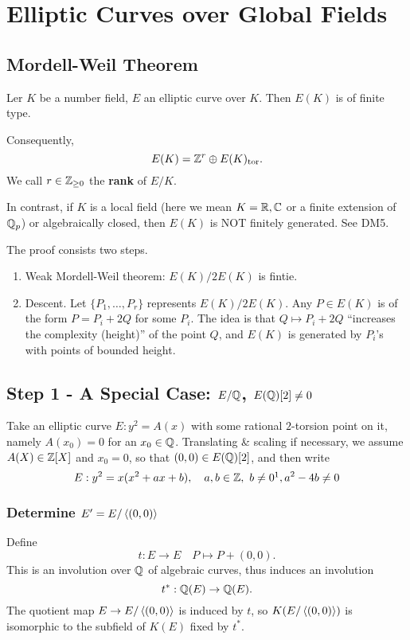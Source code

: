 \section{Elliptic Curves over Global Fields}

\subsection{Mordell-Weil Theorem}
\begin{theorem}
    Ler $K$ be a number field, $E$ an elliptic curve over $K$.
    Then $E(K)$ is of finite type.
\end{theorem}
Consequently, \[E(K) = \mathbb{Z}^r\oplus E(K)_{\mathrm{tor}}.\]
We call $r\in\mathbb{Z}_{\ge 0}$ the \textbf{rank} of $E/K$.
\begin{remark}
    In contrast, if $K$ is a local field (here we mean $K = \mathbb{R}, \mathbb{C}$ or a finite extension of $\mathbb{Q}_p$) or algebraically closed,
    then $E(K)$ is NOT finitely generated. See DM5.
\end{remark}
The proof consists two steps.
\begin{enumerate}
    \item Weak Mordell-Weil theorem: $E(K)/2E(K)$ is fintie.
    \item Descent. Let $\{P_1, \dots, P_r\}$ represents $E(K)/2E(K)$.
    Any $P\in E(K)$ is of the form
    $P = P_i +2Q$ for some $P_i$.
    The idea is that $Q\mapsto P_i + 2Q$ ``increases the complexity (height)'' of the point $Q$, and $E(K)$ is generated by $P_i$'s with points of bounded height.
\end{enumerate}

\subsection{Step 1 - A Special Case: \texorpdfstring{$E/\mathbb{Q}$, $E(\mathbb{Q})[2]\ne 0$}{E/Q, E(Q)[2] ne 0}}
Take an elliptic curve $E : y^2 = A(x)$ with some rational $2$-torsion point on it,
namely $A(x_0) = 0$ for an $x_0\in\mathbb{Q}$.
Translating \& scaling if necessary, we assume $A(X)\in\mathbb{Z}[X]$ and $x_0 = 0$,
so that $(0, 0)\in E(\mathbb{Q})[2]$, and then write
\[E : y^2 = x(x^2 + ax + b),\quad a, b\in\Z,\ b\ne 0\footnotemark, a^2 - 4b\ne 0\]
\subsubsection*{Determine \texorpdfstring{$E' = E/\left\langle (0, 0) \right\rangle$}{E' = E/<(0, 0)>}}

Define \[t : E\to E\quad P\mapsto P + (0, 0).\]
This is an involution over $\mathbb{Q}$ of algebraic curves, thus induces an involution
\[t^* : \mathbb{Q}(E)\to \mathbb{Q}(E).\]
The quotient map $E\to E/\left\langle (0, 0) \right\rangle$ is induced by $t$,
so $K(E/\left\langle (0, 0) \right\rangle)$ is isomorphic to the subfield of $K(E)$ fixed by $t^*$.


